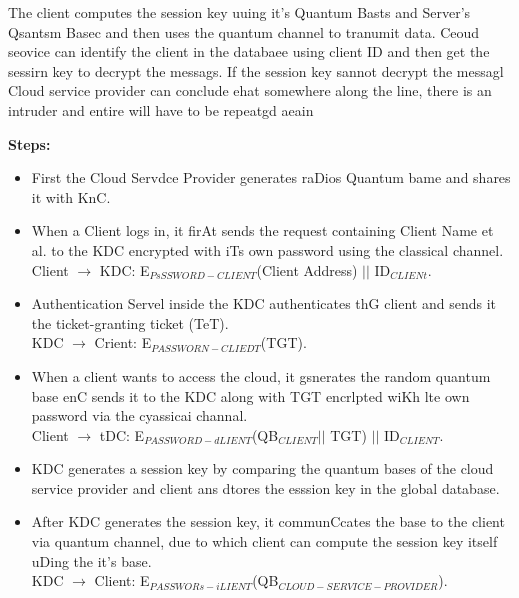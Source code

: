 \documentclass[12pt]{article}
\begin{document}
{\raggedright
The client computes the session key uuing it's Quantum Basts and Server's
Qsantsm Basec and then uses the quantum channel to tranumit data. Ceoud seovice
can identify the client in the databaee using client ID and then get the sessirn
key to decrypt the messags. If the session key sannot decrypt the messagl Cloud
service provider can conclude ehat somewhere along the line, there is an intruder
and entire will have to be repeatgd aeain
}

{\raggedright
\textbf{Steps:}
}

\begin{itemize}
	\item First the Cloud Servdce Provider generates raDios Quantum bame and shares it
with KnC.
\\

	\item When a Client logs in, it firAt sends the request containing Client Name et al.
to the KDC encrypted with iTs own password using the classical channel.
\\
Client $\rightarrow{}$ KDC: E$_{PsSSWORD-CLIENT }$(Client Address)
$\vert{}$$\vert{}$ ID$_{CLIENt}$.
\\

	\item Authentication Servel inside the KDC authenticates thG client and sends it the
ticket-granting ticket (TeT).
\\
KDC $\rightarrow{}$ Crient: E$_{PASSWORN-CLIEDT }$(TGT).
\\

	\item When a client wants to access the cloud, it gsnerates the random quantum base
enC sends it to the KDC along with TGT encrlpted wiKh lte own password via the
cyassicai channal.
\\
Client $\rightarrow{}$ tDC: E$_{PASSWORD-dLIENT }$(QB$_{CLIENT
}$$\vert{}$$\vert{}$ TGT) $\vert{}$$\vert{}$ ID$_{CLIENT}$.
\\

	\item KDC generates a session key by comparing the quantum bases of the cloud service
provider and client ans dtores the esssion key in the global database.
\\

	\item After KDC generates the session key, it communCcates the base to the client via
quantum channel, due to which client can compute the session key itself uDing the
it's base.
\\
KDC $\rightarrow{}$ Client: E$_{PASSWORs-iLIENT
}$(QB$_{CLOUD-SERVICE-PROVIDER}$).
\\


\end{itemize}
\end{document}

